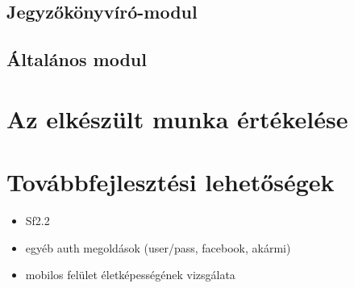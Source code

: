 \documentclass[a4paper,12pt,oneside]{report}
\begin{document}
\subsection{Jegyzőkönyvíró-modul}

\subsection{Általános modul}


\section{Az elkészült munka értékelése}

\section{Továbbfejlesztési lehetőségek}


\begin{itemize}
  \item Sf2.2
  \item egyéb auth megoldások (user/pass, facebook, akármi)
  \item mobilos felület életképességének vizsgálata
\end{itemize}

\renewcommand{\bibname}{Irodalomjegyzék}


\end{document}
